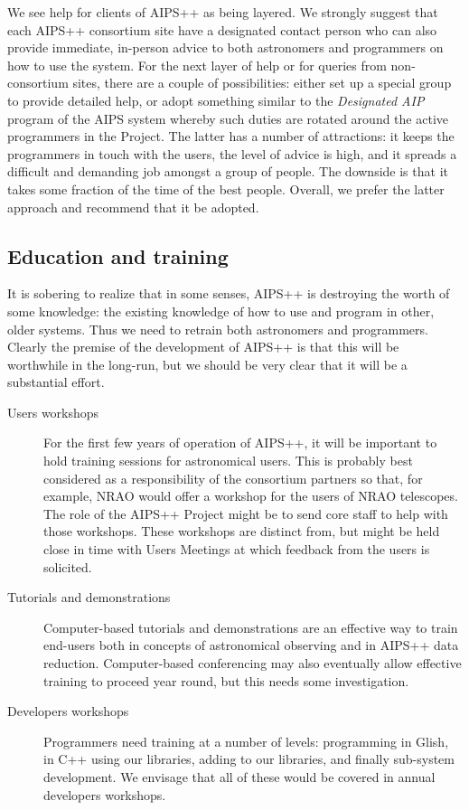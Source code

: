 We see help for clients of AIPS++ as being layered. We strongly
suggest that each AIPS++ consortium site have a designated contact
person who can also provide immediate, in-person advice to both
astronomers and programmers on how to use the system.  For the next
layer of help or for queries from non-consortium sites, there are a
couple of possibilities: either set up a special group to provide
detailed help, or adopt something similar to the {\em Designated AIP}
program of the AIPS system whereby such duties are rotated around the
active programmers in the Project.  The latter has a number of
attractions: it keeps the programmers in touch with the users, the
level of advice is high, and it spreads a difficult and demanding job
amongst a group of people. The downside is that it takes some fraction
of the time of the best people. Overall, we prefer the latter approach
and recommend that it be adopted.

\subsection{Education and training}

It is sobering to realize that in some senses, AIPS++ is destroying
the worth of some knowledge: the existing knowledge of how to use and
program in other, older systems. Thus we need to retrain both
astronomers and programmers. Clearly the premise of the development of
AIPS++ is that this will be worthwhile in the long-run, but we should
be very clear that it will be a substantial effort.

\begin{description}
\item[Users workshops] For the first few years of operation of
AIPS++, it will be important to hold training sessions for
astronomical users. This is probably best considered as a
responsibility of the consortium partners so that, for example, NRAO
would offer a workshop for the users of NRAO telescopes. The role of
the AIPS++ Project might be to send core staff to help with those
workshops.  These workshops are distinct from, but might be held close
in time with Users Meetings at which feedback from the users is
solicited.
\item[Tutorials and demonstrations] Computer-based tutorials and
demonstrations are an effective way to train end-users both in
concepts of astronomical observing and in AIPS++ data reduction.
Computer-based conferencing may also eventually allow effective
training to proceed year round, but this needs some investigation.
\item[Developers workshops] Programmers need training at a number of
levels: programming in Glish, in C++ using our libraries, adding to
our libraries, and finally sub-system development. We envisage that
all of these would be covered in annual developers workshops.
\end{description}

